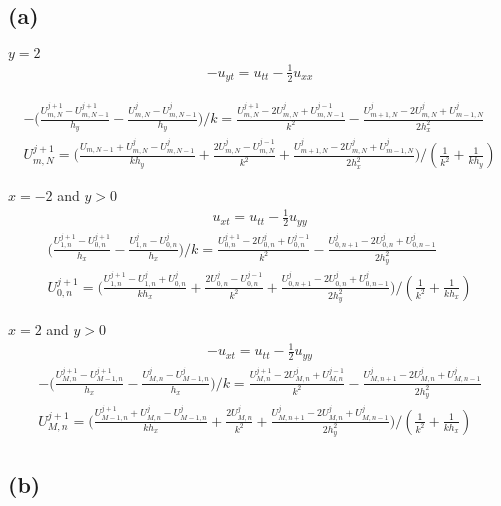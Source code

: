 \documentclass[en,hazy,screen,blue,normal]{elegantnote}
\begin{document}
\subsection{(a)}
$y=2$
\begin{align*}
    -u_{yt} = u_{tt} - \frac{1}{2} u_{xx}
\end{align*}

\begin{align*}
    - \biggl(\frac{U_{m, N}^{j+1} - U_{m, N-1}^{j+1}}{h_y} - \frac{U_{m, N}^j - U_{m, N-1}^j}{h_y}\biggr)/k 
    = \frac{U_{m,N}^{j+1} - 2U_{m,N}^{j} + U_{m,N-1}^{j-1}}{k^2} -  \frac{U_{m+1, N}^{j} - 2U_{m,N}^j + U_{m-1, N}^j}{2h_x^2} \\
    U_{m, N}^{j+1} = \biggl(\frac{U_{m, N-1} + U_{m,N}^j - U_{m, N-1}^j}{k h_y} + \frac{2U_{m,N}^j - U_{m, N}^{j-1}}{k^2} + \frac{U_{m+1, N}^j - 2U_{m, N}^j + U_{m-1, N}^j}{2h_x^2} \biggr)/(\frac{1}{k^2} + \frac{1}{kh_y})
\end{align*}

$x=-2$ and $y>0$
\begin{align*}
    u_{xt} = u_{tt} - \frac{1}{2} u_{yy}
\end{align*}
\begin{align*}
    \biggl(\frac{U_{1, n}^{j+1} - U_{0, n}^{j+1}}{h_x} - \frac{U_{1, n}^{j} - U_{0, n}^{j}}{h_x}\biggr)/k
    = \frac{U_{0, n}^{j+1} - 2U_{0, n}^j + U_{0, n}^{j-1}}{k^2} - \frac{U_{0, n+1}^j - 2U_{0, n}^j + U_{0, n-1}^j}{2 h_y^2} \\
    U_{0, n}^{j+1} = \biggl(\frac{U_{1, n}^{j+1} - U_{1, n}^{j} + U_{0, n}^j}{k h_x} + \frac{2 U_{0, n}^{j} - U_{0, n}^{j-1}}{k^2} + \frac{U_{0, n+1}^{j} - 2U_{0, n}^j + U_{0, n-1}^j}{2h_y^2}\biggr)/(\frac{1}{k^2} + \frac{1}{kh_x})
\end{align*}

$x = 2$ and $y>0$
\begin{align*}
    - u_{xt} = u_{tt} - \frac{1}{2} u_{yy}
\end{align*}
\begin{align*}
    - \biggl(\frac{U_{M, n}^{j+1} - U_{M-1, n}^{j+1}}{h_x} - \frac{U_{M, n}^{j} - U_{M-1, n}^{j}}{h_x}\biggr)/k
    = \frac{U_{M, n}^{j+1} -2U_{M, n}^j + U_{M, n}^{j-1}}{k^2} -\frac{U_{M, n+1}^j - 2U_{M, n}^j + U_{M, n-1}^j}{2h_y^2} \\
    U_{M, n}^{j+1} = \biggl(\frac{U_{M-1, n}^{j+1} +U_{M, n}^j -U_{M-1, n}^j}{k h_x} + \frac{2U_{M, n}^j}{k^2} + \frac{U_{M, n+1}^j - 2U_{M, n}^j + U_{M, n-1}^j}{2h_y^2}\biggr)/(\frac{1}{k^2} + \frac{1}{k h_x})
\end{align*}



\subsection{(b)}
\end{document}
